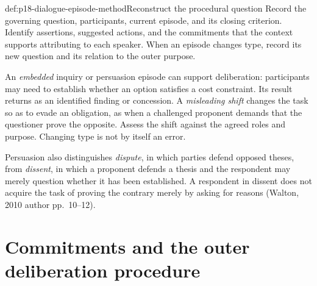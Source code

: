 \begin{hbmethod}{def:p18-dialogue-episode-method}{Reconstruct the procedural question}
Record the governing question, participants, current episode, and its
closing criterion. Identify assertions, suggested actions, and the
commitments that the context supports attributing to each speaker.
When an episode changes type, record its new question and its relation
to the outer purpose.

An \emph{embedded} inquiry or persuasion episode can support deliberation:
participants may need to establish whether an option satisfies a cost
constraint. Its result returns as an identified finding or concession.
A \emph{misleading shift} changes the task so as to evade an obligation,
as when a challenged proponent demands that the questioner prove the
opposite. Assess the shift against the agreed roles and purpose.
Changing type is not by itself an error.
\end{hbmethod}

Persuasion also distinguishes \emph{dispute}, in which parties defend
opposed theses, from \emph{dissent}, in which a proponent defends a thesis
and the respondent may merely question whether it has been established.
A respondent in dissent does not acquire the task of proving the
contrary merely by asking for reasons (Walton, 2010 author pp.~10--12).

\section{Commitments and the outer deliberation procedure}
\label{sec:p18-dialogue-commitments}

